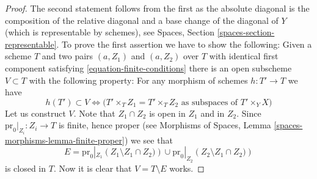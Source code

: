 \documentclass{stacks-project}
\theoremstyle{plain}
\theoremstyle{definition}
\theoremstyle{remark}
\numberwithin{equation}{subsection}
\begin{document}
\begin{proof}
The second statement follows from the first as the absolute diagonal
is the composition of the relative diagonal and a base change
of the diagonal of $Y$ (which is representable by schemes), see
Spaces, Section \ref{spaces-section-representable}.
To prove the first assertion we have to show the following:
Given a scheme $T$ and two pairs $(a, Z_1)$ and $(a, Z_2)$ over $T$
with identical first component
satisfying \ref{equation-finite-conditions}
there is an open subscheme $V \subset T$ with the following
property: For any morphism of schemes $h : T' \to T$ we have
$$
h(T') \subset V \Leftrightarrow
\Big(T' \times_T Z_1 = T' \times_T Z_2
\text{ as subspaces of }T' \times_Y X\Big)
$$
Let us construct $V$. Note that $Z_1 \cap Z_2$ is open in $Z_1$
and in $Z_2$. Since $\text{pr}_0|_{Z_i} : Z_i \to T$ is finite,
hence proper (see
Morphisms of Spaces, Lemma \ref{spaces-morphisms-lemma-finite-proper})
we see that
$$
E =
\text{pr}_0|_{Z_1}\left(Z_1 \setminus Z_1 \cap Z_2)\right)
\cup
\text{pr}_0|_{Z_2}\left(Z_2 \setminus Z_1 \cap Z_2)\right)
$$
is closed in $T$. Now it is clear that $V = T \setminus E$ works.
\end{proof}
\end{document}
